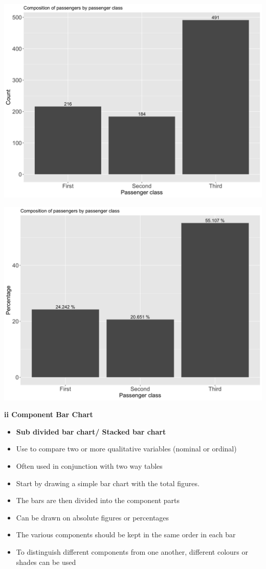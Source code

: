 \documentclass[]{book}
\providecommand{\tightlist}{%
  \setlength{\itemsep}{0pt}\setlength{\parskip}{0pt}}
\begin{document}
\begin{center}\includegraphics[width=0.8\linewidth]{figure/box8-1} \end{center}

\begin{center}\includegraphics[width=0.8\linewidth]{figure/box9-1} \end{center}

\textbf{ii Component Bar Chart }

\begin{itemize}
\tightlist
\item
  \textbf{Sub divided bar chart/ Stacked bar chart}
\item
  Use to compare two or more qualitative variables (nominal or ordinal)
\item
  Often used in conjunction with two way tables
\item
  Start by drawing a simple bar chart with the total figures.
\item
  The bars are then divided into the component parts
\item
  Can be drawn on absolute figures or percentages
\item
  The various components should be kept in the same order in each bar
\item
  To distinguish different components from one another, different colours or shades can be used
\end{itemize}
\end{document}
